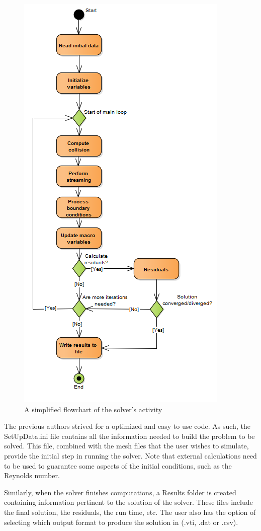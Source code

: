 \documentclass[12pt, openany]{book}
\begin{document}
\begin{figure}[H]
	\centering
	\includegraphics[width=0.5\linewidth]{Resources/Images/CodeFlowchart.png}
	\caption{A simplified flowchart of the solver's activity}
	\label{fig:codeFlow}
\end{figure}

The previous authors strived for a optimized and easy to use code. As such, the SetUpData.ini file contains all the information needed to build the problem to be solved. This file, combined with the mesh files that the user wishes to simulate, provide the initial step in running the solver. Note that external calculations need to be used to guarantee some aspects of the initial conditions, such as the Reynolds number.\par
Similarly, when the solver finishes computations, a Results folder is created containing information pertinent to the solution of the solver. These files include the final solution, the residuals, the run time, etc. The user also has the option of selecting which output format to produce the solution in (.vti, .dat or .csv).
\end{document}
